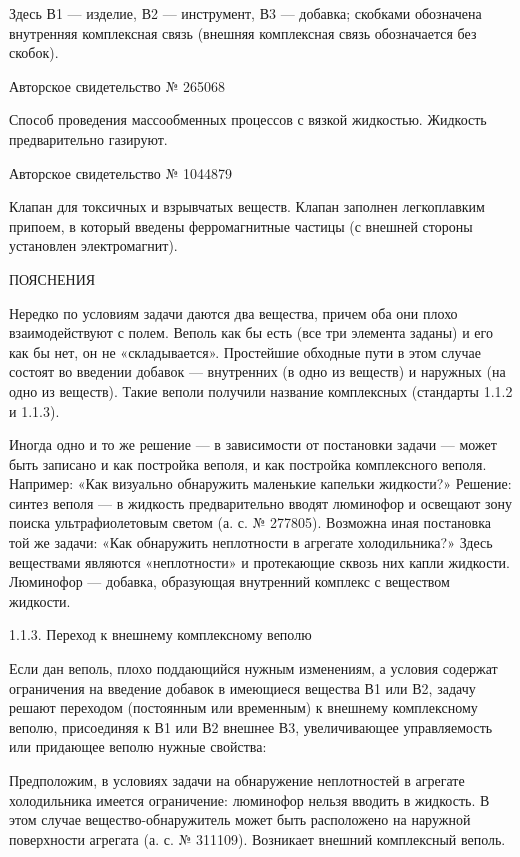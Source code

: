 Здесь В1 — изделие, В2 — инструмент, В3 — добавка; скобками обозначена
внутренняя комплексная  связь (внешняя комплексная  связь обозначается
без скобок).


Авторское свидетельство № 265068

Способ проведения массообменных процессов с вязкой жидкостью. Жидкость
предварительно газируют.

Авторское свидетельство № 1044879

Клапан   для  токсичных   и   взрывчатых   веществ.  Клапан   заполнен
легкоплавким  припоем, в  который  введены  ферромагнитные частицы  (с
внешней стороны установлен электромагнит).

ПОЯСНЕНИЯ

Нередко по условиям  задачи даются два вещества, причем  оба они плохо
взаимодействуют с полем. Веполь как  бы есть (все три элемента заданы)
и его  как бы нет,  он не  «складывается». Простейшие обходные  пути в
этом  случае состоят  во  введении  добавок —  внутренних  (в одно  из
веществ)  и  наружных (на  одно  из  веществ). Такие  веполи  получили
название комплексных (стандарты 1.1.2 и 1.1.3).


Иногда  одно и  то же  решение —  в зависимости  от постановки  задачи
—  может  быть  записано  и  как постройка  веполя,  и  как  постройка
комплексного  веполя. Например:  «Как  визуально обнаружить  маленькие
капельки жидкости?» Решение: синтез веполя — в жидкость предварительно
вводят  люминофор  и  освещают  зону  поиска  ультрафиолетовым  светом
(а.  с.  № 277805).  Возможна  иная  постановка  той же  задачи:  «Как
обнаружить  неплотности  в  агрегате холодильника?»  Здесь  веществами
являются  «неплотности»  и  протекающие  сквозь  них  капли  жидкости.
Люминофор  —  добавка,  образующая  внутренний  комплекс  с  веществом
жидкости.

1.1.3. Переход к внешнему комплексному веполю

Если  дан  веполь,  плохо  поддающийся нужным  изменениям,  а  условия
содержат ограничения на  введение добавок в имеющиеся  вещества В1 или
В2,  задачу решают  переходом  (постоянным или  временным) к  внешнему
комплексному веполю, присоединяя к В1 или В2 внешнее В3, увеличивающее
управляемость или придающее веполю нужные свойства:


Предположим, в условиях задачи  на обнаружение неплотностей в агрегате
холодильника имеется ограничение: люминофор нельзя вводить в жидкость.
В этом случае вещество-обнаружитель может быть расположено на наружной
поверхности агрегата  (а. с. № 311109).  Возникает внешний комплексный
веполь.

